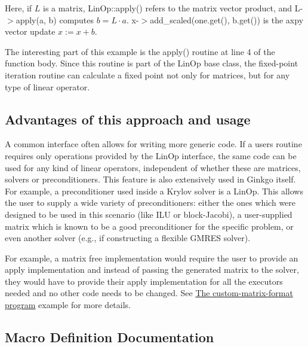 Here, if $L$ is a matrix, Lin\+Op\+::apply() refers to the matrix vector product, and {\ttfamily L-\/$>$apply(a, b)} computes $b = L \cdot a$. {\ttfamily x-\/$>$add\+\_\+scaled(one.\+get(), b.\+get())} is the {\ttfamily axpy} vector update $x:=x+b$.

The interesting part of this example is the apply() routine at line 4 of the function body. Since this routine is part of the Lin\+Op base class, the fixed-\/point iteration routine can calculate a fixed point not only for matrices, but for any type of linear operator.\hypertarget{group__LinOp_linop_3}{}\subsection{Advantages of this approach and usage}\label{group__LinOp_linop_3}
A common interface often allows for writing more generic code. If a user\textquotesingle{}s routine requires only operations provided by the Lin\+Op interface, the same code can be used for any kind of linear operators, independent of whether these are matrices, solvers or preconditioners. This feature is also extensively used in Ginkgo itself. For example, a preconditioner used inside a Krylov solver is a Lin\+Op. This allows the user to supply a wide variety of preconditioners\+: either the ones which were designed to be used in this scenario (like I\+LU or block-\/\+Jacobi), a user-\/supplied matrix which is known to be a good preconditioner for the specific problem, or even another solver (e.\+g., if constructing a flexible G\+M\+R\+ES solver).

For example, a matrix free implementation would require the user to provide an apply implementation and instead of passing the generated matrix to the solver, they would have to provide their apply implementation for all the executors needed and no other code needs to be changed. See \hyperlink{custom_matrix_format}{The custom-\/matrix-\/format program} example for more details. 

\subsection{Macro Definition Documentation}
\mbox{\label{group__LinOp_ga1fc8e9d8be0c9ad2d72bc1ddfc6d8358}} 
